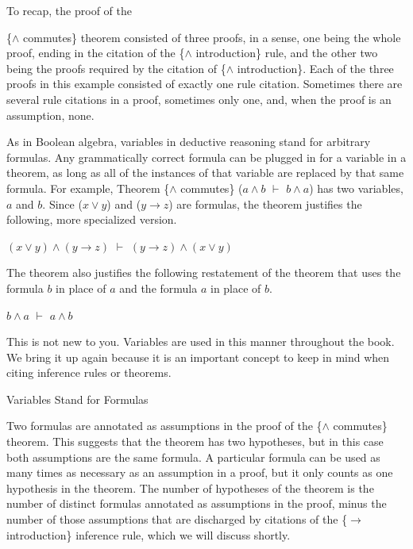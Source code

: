 To recap, the proof of the {\{$\wedge$ commutes\} theorem
consisted of three proofs, in a sense,
one being the whole proof, ending in the citation of
the \{$\wedge$ introduction\} rule,
and the other two being the proofs required by the citation of \{$\wedge$ introduction\}.
Each of the three proofs in this example consisted of exactly one rule citation.
Sometimes there are several rule citations in a proof, sometimes only one,
and, when the proof is an assumption, none.

\begin{aside}
As in Boolean algebra, variables in deductive reasoning
stand for arbitrary formulas.
Any grammatically correct formula
can be plugged in for a variable in a theorem,
as long as all of the instances of that variable are
replaced by that same formula.
For example,
Theorem \{$\wedge$ commutes\} ($a \wedge b$ $\vdash$ $b \wedge a$)
has two variables, $a$ and $b$.
Since ($x \vee y$) and ($y \rightarrow z$) are formulas,
the theorem justifies the following, more specialized
version.
\begin{center}
$(x \vee y) \wedge (y \rightarrow z)$ $\vdash$ $(y \rightarrow z) \wedge (x \vee y)$
\end{center}
The theorem also justifies the following restatement of the
theorem that uses the formula $b$ in place of $a$ and the formula $a$ in place of $b$.
\begin{center}
$b \wedge a$ $\vdash$ $a \wedge b$
\end{center}
This is not new to you.
Variables are used in this manner throughout the book.
We bring it up again because it is an important
concept to keep in mind when citing inference rules
or theorems.
\caption{Variables Stand for Formulas}
\label{variable-stand-for-formulas}
\end{aside}

Two formulas are annotated as assumptions in the
proof of the \{$\wedge$ commutes\} theorem.
This suggests that the theorem has
two hypotheses,
but in this case both assumptions are the same formula.
A particular formula can be used as many times as necessary as
an assumption in a proof, but it only counts as one hypothesis
in the theorem.
The number of hypotheses
of the theorem is the number of distinct
formulas annotated as assumptions in the proof,
minus the number of those assumptions that are discharged
by citations of the \{$\rightarrow$ introduction\} inference rule,
which we will discuss shortly.

}
